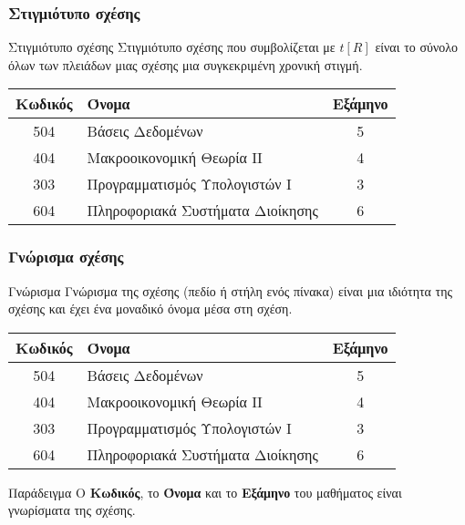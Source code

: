 \begin{frame}
\frametitle{Στιγμιότυπο σχέσης}
  \begin{block}{Στιγμιότυπο σχέσης}
    Στιγμιότυπο σχέσης που συμβολίζεται με $t[R]$ είναι το σύνολο όλων των πλειάδων μιας σχέσης
    μια συγκεκριμένη χρονική στιγμή.
 \end{block}
  \begin{tabular}{ c l c } \toprule
    {\bf Κωδικός} & {\bf Όνομα} & {\bf Εξάμηνο} \\ \midrule 
    504 & Βάσεις Δεδομένων & 5 \\ 
    404 & Μακροοικονομική Θεωρία ΙΙ & 4 \\  
    303 & Προγραμματισμός Υπολογιστών Ι & 3 \\   
    604 & Πληροφοριακά Συστήματα Διοίκησης & 6 \\  \bottomrule
  \end{tabular} 
\end{frame}


\begin{frame}
\frametitle{Γνώρισμα σχέσης}
  \begin{block}{Γνώρισμα}
    Γνώρισμα της σχέσης (πεδίο ή στήλη ενός πίνακα) είναι μια ιδιότητα της σχέσης
    και έχει ένα μοναδικό όνομα μέσα στη σχέση.
  \end{block}
\begin{minipage}{0.94\textwidth}
  \begin{tabular}{ c l c } \toprule
    {\bf Κωδικός} & {\bf Όνομα} & {\bf Εξάμηνο} \\ \midrule 
    504 & Βάσεις Δεδομένων & 5 \\ 
    404 & Μακροοικονομική Θεωρία ΙΙ & 4 \\  
    303 & Προγραμματισμός Υπολογιστών Ι & 3 \\   
    604 & Πληροφοριακά Συστήματα Διοίκησης & 6 \\  \bottomrule
  \end{tabular}
  \begin{exampleblock}{Παράδειγμα}
    Ο {\bf Κωδικός}, το {\bf Όνομα} και το {\bf Εξάμηνο} του μαθήματος
    είναι γνωρίσματα της σχέσης.
  \end{exampleblock}  
\end{minipage}  
\end{frame}


